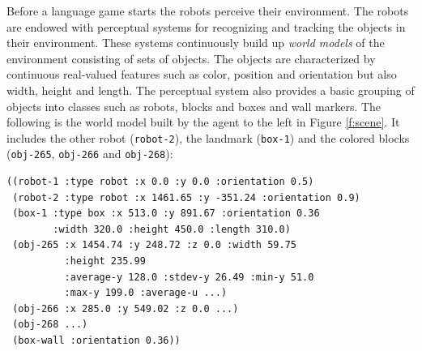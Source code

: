 Before a language game starts the robots perceive their
environment. The robots are endowed with perceptual systems 
for recognizing and tracking the objects in their environment.
These systems continuously build up \emph{world models} of the environment
consisting of sets of objects. The objects are characterized by continuous
real-valued features such as color, position and orientation but also
width, height and length. The perceptual system also provides a basic
grouping of objects into classes such as robots, blocks and boxes and wall markers. 
The following is the world model built by the agent to the left in Figure
\ref{f:scene}. It includes the other robot ({\footnotesize\texttt{robot-2}}), the
landmark ({\footnotesize\texttt{box-1}}) and the colored blocks ({\footnotesize\texttt{obj-265}},
{\footnotesize\texttt{obj-266}} and {\footnotesize\texttt{obj-268}}):
\label{world-model-example}
\begin{footnotesize}
\begin{verbatim}
((robot-1 :type robot :x 0.0 :y 0.0 :orientation 0.5)
 (robot-2 :type robot :x 1461.65 :y -351.24 :orientation 0.9)
 (box-1 :type box :x 513.0 :y 891.67 :orientation 0.36 
        :width 320.0 :height 450.0 :length 310.0)
 (obj-265 :x 1454.74 :y 248.72 :z 0.0 :width 59.75 
          :height 235.99 
          :average-y 128.0 :stdev-y 26.49 :min-y 51.0 
          :max-y 199.0 :average-u ...)
 (obj-266 :x 285.0 :y 549.02 :z 0.0 ...)
 (obj-268 ...)
 (box-wall :orientation 0.36))
\end{verbatim}
\end{footnotesize}


